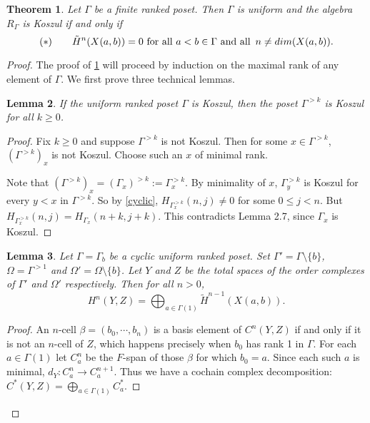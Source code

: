 \documentclass[11pt,righttag]{amsart}
\newtheorem{thm}{Theorem}[section]
\newtheorem{lemma}[thm]{Lemma}
\theoremstyle{definition}
\begin{document}
\begin{thm}\label{main2}
Let $\Gamma$ be a finite ranked poset.   Then $\Gamma$ is uniform and the algebra $R_\Gamma$ is Koszul if and only if 
$$(*) \qquad \tilde H^n(X(a,b)) = 0 \hbox{ for all } a<b\in \Gamma \hbox{ and all\, } n\ne dim(X(a,b)).$$
\end{thm}
 
\begin{proof}

The proof of \ref{main2} will proceed by induction on the maximal rank of any element of $\Gamma$.  We first prove three technical lemmas. 

\begin{lemma}\label{lemma1}  If the uniform ranked poset $\Gamma$ is Koszul, then the poset $\Gamma^{>k}$ is Koszul for all 
$k\ge 0$. 
\end{lemma}

\begin {proof}
Fix $k\ge 0$ and suppose $\Gamma^{>k}$ is not Koszul.  Then for some $x\in \Gamma^{>k}$,  $(\Gamma^{>k})_x$ is not 
Koszul.  Choose such an $x$ of minimal rank.   

 Note that $(\Gamma^{>k})_x  = (\Gamma_x)^{>k}:= \Gamma_x^{>k}$.   By minimality of $x$, $\Gamma_y^{>k}$ is Koszul
 for every $y<x$ in $\Gamma^{>k}$.  So by \ref{cyclic}, $H_{\Gamma_x^{>k}}(n,j) \ne 0$ for some $0\le j<n $.   But 
  $H_{\Gamma_x^{>k}}(n,j) = H_{\Gamma_x}(n+k,j+k)$.   This contradicts Lemma 2.7, since $\Gamma_x$ is Koszul. 
\end{proof}

\begin{lemma}\label{lemma2} Let $\Gamma=\Gamma_b$ be a cyclic uniform ranked poset.  Set $\Gamma'=\Gamma\setminus\{b\}$, 
$\Omega = \Gamma^{>1}$ and $\Omega' = \Omega\setminus\{b\}$.  Let $Y$ and $Z$ be the total spaces of the order complexes of 
$\Gamma'$ and $\Omega'$ respectively.  Then for all $n>0$,
$$H^n(Y,Z) = \bigoplus_{a\in \Gamma(1)} \tilde H^{n-1}(X(a,b)).$$
\end{lemma}

\begin{proof}
An $n$-cell $\beta = (b_0,\cdots,b_n)$ is a basis element of $C^n(Y,Z)$ if and only if it is not an $n$-cell of $Z$, which happens 
precisely when $b_0$ has rank 1 in $\Gamma$.  For each $a\in \Gamma(1)$ let $C_a^n$ be the $F$-span of those $\beta$ for which
$b_0=a$.  Since each such $a$ is minimal, $d_Y:C_a^n \to C_a^{n+1}$.  Thus we have a cochain complex decomposition: 
$C^*(Y,Z) = \bigoplus_{a\in \Gamma(1)} C_a^*$.  


\end{proof}
\end{proof}
\end{document}

